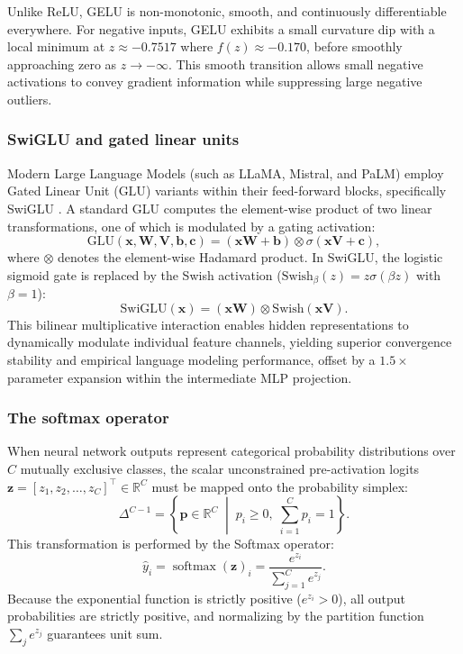 \documentclass[../../../main.tex]{subfiles}
\begin{document}
Unlike ReLU, GELU is non-monotonic, smooth, and continuously differentiable everywhere. For negative inputs, GELU exhibits a small curvature dip with a local minimum at $z \approx -0.7517$ where $f(z) \approx -0.170$, before smoothly approaching zero as $z \to -\infty$. This smooth transition allows small negative activations to convey gradient information while suppressing large negative outliers.

\subsubsection{SwiGLU and gated linear units}

Modern Large Language Models (such as LLaMA, Mistral, and PaLM) employ Gated Linear Unit ($\text{GLU}$) variants within their feed-forward blocks, specifically SwiGLU \citep{shazeer2020glu}. A standard GLU computes the element-wise product of two linear transformations, one of which is modulated by a gating activation:
\begin{equation}
\text{GLU}(\mathbf{x}, \mathbf{W}, \mathbf{V}, \mathbf{b}, \mathbf{c}) = \left(\mathbf{x}\mathbf{W} + \mathbf{b}\right) \otimes \sigma\left(\mathbf{x}\mathbf{V} + \mathbf{c}\right),
\end{equation}
where $\otimes$ denotes the element-wise Hadamard product. In SwiGLU, the logistic sigmoid gate is replaced by the Swish activation ($\text{Swish}_\beta(z) = z \sigma(\beta z)$ with $\beta = 1$):
\begin{equation}
\text{SwiGLU}(\mathbf{x}) = \left( \mathbf{x}\mathbf{W} \right) \otimes \text{Swish}\left( \mathbf{x}\mathbf{V} \right).
\end{equation}
This bilinear multiplicative interaction enables hidden representations to dynamically modulate individual feature channels, yielding superior convergence stability and empirical language modeling performance, offset by a $1.5\times$ parameter expansion within the intermediate MLP projection.

\subsubsection{The softmax operator}

When neural network outputs represent categorical probability distributions over $C$ mutually exclusive classes, the scalar unconstrained pre-activation logits $\mathbf{z} = [z_1, z_2, \dots, z_C]^\top \in \mathbb{R}^C$ must be mapped onto the probability simplex:
\begin{equation}
\Delta^{C-1} = \left\{ \mathbf{p} \in \mathbb{R}^C \;\middle|\; p_i \ge 0, \; \sum_{i=1}^C p_i = 1 \right\}.
\end{equation}
This transformation is performed by the Softmax operator:
\begin{equation}
\hat{y}_i = \operatorname{softmax}(\mathbf{z})_i = \frac{e^{z_i}}{\sum_{j=1}^C e^{z_j}}.
\label{eq:softmax_definition}
\end{equation}
Because the exponential function is strictly positive ($e^{z_i} > 0$), all output probabilities are strictly positive, and normalizing by the partition function $\sum_j e^{z_j}$ guarantees unit sum.
\end{document}
